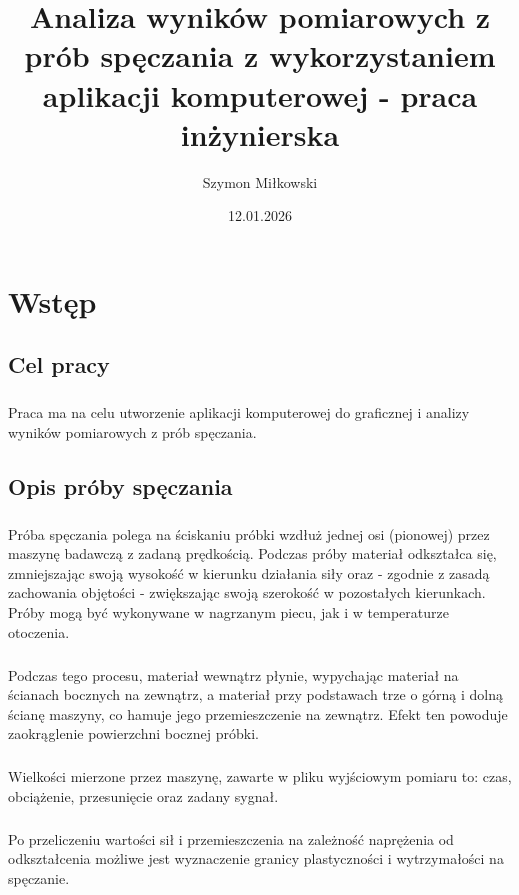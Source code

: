 \documentclass[12pt]{report}
\title{Analiza wyników pomiarowych z prób spęczania z wykorzystaniem aplikacji komputerowej - praca inżynierska}
\date{12.01.2026}
\author{Szymon Miłkowski}
\begin{document}
	\chapter{Wstęp}
	\section{Cel pracy}
	\paragraph{}
	Praca ma na celu utworzenie aplikacji komputerowej do graficznej i analizy wyników pomiarowych z prób spęczania.
	
	\section{Opis próby spęczania}
	\paragraph{}
	Próba spęczania polega na ściskaniu próbki wzdłuż jednej osi (pionowej) przez maszynę
	badawczą z zadaną prędkością. Podczas próby materiał odkształca się, zmniejszając swoją
	wysokość w kierunku działania siły oraz - zgodnie z zasadą zachowania objętości - zwiększając swoją szerokość w pozostałych kierunkach. Próby mogą być wykonywane w nagrzanym piecu, jak i w temperaturze otoczenia.
	
	\paragraph{}
	Podczas tego procesu, materiał wewnątrz płynie, wypychając materiał na ścianach bocznych na zewnątrz, a materiał przy podstawach trze o górną i dolną ścianę maszyny, co
	hamuje jego przemieszczenie na zewnątrz. Efekt ten powoduje zaokrąglenie powierzchni bocznej próbki.
	
	\paragraph{}
	Wielkości mierzone przez maszynę, zawarte w pliku wyjściowym pomiaru to: czas, obciążenie, przesunięcie oraz zadany sygnał.
	
	\paragraph{}
	Po przeliczeniu wartości sił i przemieszczenia na zależność naprężenia od odkształcenia możliwe jest wyznaczenie granicy plastyczności i wytrzymałości na spęczanie.
	
\end{document}
